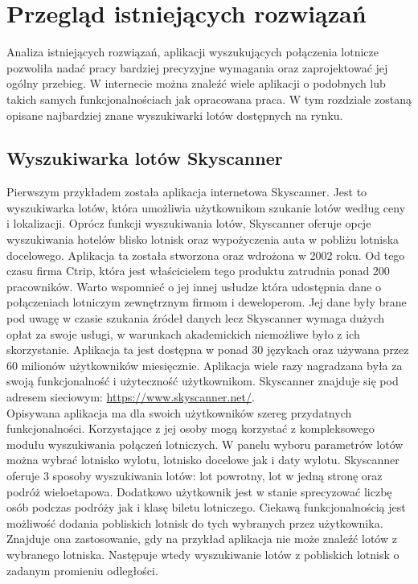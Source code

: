 \documentclass[12pt, twoside]{report}
\begin{document}
\chapter{Przegląd istniejących rozwiązań}
Analiza istniejących rozwiązań, aplikacji wyszukujących połączenia lotnicze pozwoliła nadać pracy bardziej precyzyjne wymagania oraz zaprojektować jej ogólny przebieg. W internecie można znaleźć wiele aplikacji o podobnych lub takich samych funkcjonalnościach jak opracowana praca. W tym rozdziale zostaną opisane najbardziej znane wyszukiwarki lotów dostępnych na rynku. 
\section{Wyszukiwarka lotów Skyscanner}
Pierwszym przykładem została aplikacja internetowa Skyscanner. Jest to wyszukiwarka lotów, która umożliwia użytkownikom szukanie lotów według ceny i lokalizacji. Oprócz funkcji wyszukiwania lotów, Skyscanner oferuje opcje wyszukiwania hotelów blisko lotnisk oraz wypożyczenia auta w pobliżu lotniska docelowego. Aplikacja ta została stworzona oraz wdrożona w 2002 roku. Od tego czasu firma Ctrip, która jest właścicielem tego produktu zatrudnia ponad 200 pracowników. Warto wspomnieć o jej innej usłudze która udostępnia dane o połączeniach lotniczym zewnętrznym firmom i deweloperom. Jej dane były brane pod uwagę w czasie szukania źródeł danych lecz Skyscanner wymaga dużych opłat za swoje usługi, w warunkach akademickich niemożliwe było z ich skorzystanie.
Aplikacja ta jest dostępna w ponad 30 językach oraz używana przez 60 milionów użytkowników miesięcznie. Aplikacja wiele razy nagradzana była za swoją funkcjonalność i użyteczność użytkownikom. Skyscanner znajduje się pod adresem sieciowym: 
\url{https://www.skyscanner.net/}.\\ \indent
Opisywana aplikacja ma dla swoich użytkowników szereg przydatnych funkcjonalności. Korzystające z jej osoby mogą korzystać z kompleksowego modułu wyszukiwania połączeń lotniczych. W panelu wyboru parametrów lotów można wybrać lotnisko wylotu, lotnisko docelowe jak i daty wylotu. Skyscanner oferuje 3 sposoby wyszukiwania lotów: lot powrotny, lot w jedną stronę oraz podróż wieloetapowa. Dodatkowo użytkownik jest w stanie sprecyzować liczbę osób podczas podróży jak i klasę biletu lotniczego. Ciekawą funkcjonalnością jest możliwość dodania pobliskich lotnisk do tych wybranych przez użytkownika. Znajduje ona zastosowanie, gdy na przykład aplikacja nie może znaleźć lotów z wybranego lotniska. Następuje wtedy wyszukiwanie lotów z pobliskich lotnisk o zadanym promieniu odległości.
\end{document}
